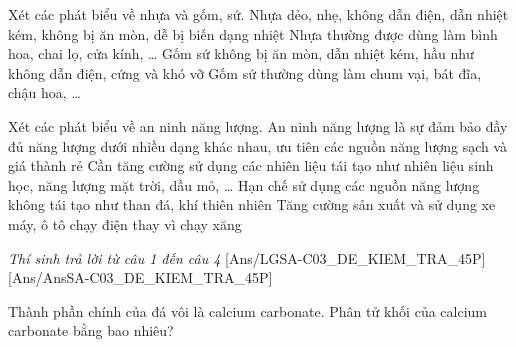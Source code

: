 \documentclass[Main.tex]{subfiles}
\begin{document}
\begin{ex}%
	Xét các phát biểu về nhựa và gốm, sứ.
	\choiceTF
	{\True Nhựa dẻo, nhẹ, không dẫn điện, dẫn nhiệt kém, không bị ăn mòn, dễ bị biến dạng nhiệt}
	{Nhựa thường được dùng làm bình hoa, chai lọ, cửa kính, …}
	{Gốm sứ không bị ăn mòn, dẫn nhiệt kém, hầu như không dẫn điện, cứng và khó vỡ}
	{\True Gốm sứ thường dùng làm chum vại, bát đĩa, chậu hoa, …}
\end{ex}

\begin{ex}%
	Xét các phát biểu về an ninh năng lượng.
	\choiceTF
	{\True An ninh năng lượng là sự đảm bảo đầy đủ năng lượng dưới nhiều dạng khác nhau, ưu tiên các nguồn năng lượng sạch và giá thành rẻ}
	{Cần tăng cường sử dụng các nhiên liệu tái tạo như nhiên liệu sinh học, năng lượng mặt trời, dầu mỏ, …}
	{\True Hạn chế sử dụng các nguồn năng lượng không tái tạo như than đá, khí thiên nhiên}
	{\True Tăng cường sản xuất và sử dụng xe máy, ô tô chạy điện thay vì chạy xăng}
\end{ex}

\textit{\large Thí sinh trả lời từ câu 1 đến câu 4}
[Ans/LGSA-C03_DE_KIEM_TRA_45P]
[Ans/AnsSA-C03_DE_KIEM_TRA_45P]
\setcounter{ex}{0}

\begin{ex}%
	Thành phần chính của đá vôi là calcium carbonate. Phân tử khối của calcium carbonate bằng bao nhiêu?
\end{ex}
\end{document}
